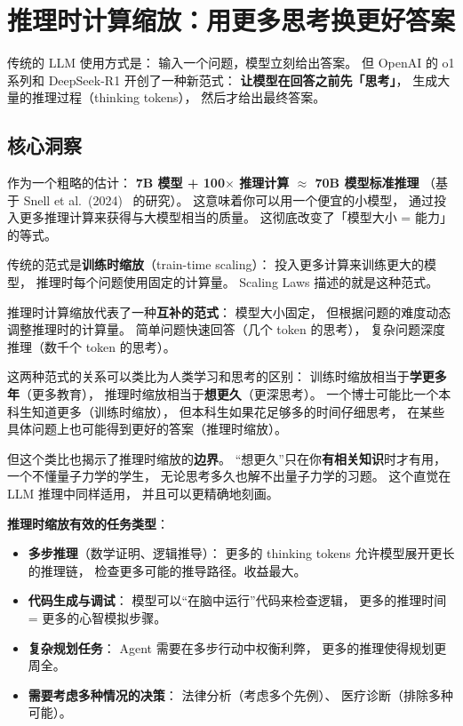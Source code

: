 \chapter{推理时计算缩放：用更多思考换更好答案}
\label{ch:ttc}

传统的 LLM 使用方式是：
输入一个问题，模型立刻给出答案。
但 OpenAI 的 o1 系列和 DeepSeek-R1 开创了一种新范式：
\textbf{让模型在回答之前先「思考」}，
生成大量的推理过程（thinking tokens），
然后才给出最终答案。

\section{核心洞察}

\begin{corebox}[推理时计算的颠覆性影响]
作为一个粗略的估计：
\textbf{7B 模型 + 100$\times$ 推理计算 $\approx$ 70B 模型标准推理}
（基于 Snell et al.\ (2024)~\cite{snell2024scaling} 的研究）。
这意味着你可以用一个便宜的小模型，
通过投入更多推理计算来获得与大模型相当的质量。
这彻底改变了「模型大小 = 能力」的等式。
\end{corebox}

传统的范式是\textbf{训练时缩放}（train-time scaling）：
投入更多计算来训练更大的模型，
推理时每个问题使用固定的计算量。
Scaling Laws 描述的就是这种范式。

推理时计算缩放代表了一种\textbf{互补的范式}：
模型大小固定，
但根据问题的难度动态调整推理时的计算量。
简单问题快速回答（几个 token 的思考），
复杂问题深度推理（数千个 token 的思考）。

这两种范式的关系可以类比为人类学习和思考的区别：
训练时缩放相当于\textbf{学更多年}（更多教育），
推理时缩放相当于\textbf{想更久}（更深思考）。
一个博士可能比一个本科生知道更多（训练时缩放），
但本科生如果花足够多的时间仔细思考，
在某些具体问题上也可能得到更好的答案（推理时缩放）。

但这个类比也揭示了推理时缩放的\textbf{边界}。
“想更久”只在你\textbf{有相关知识}时才有用，
一个不懂量子力学的学生，
无论思考多久也解不出量子力学的习题。
这个直觉在 LLM 推理中同样适用，
并且可以更精确地刻画。

\textbf{推理时缩放有效的任务类型}：
\begin{itemize}[noitemsep]
  \item \textbf{多步推理}（数学证明、逻辑推导）：
        更多的 thinking tokens 允许模型展开更长的推理链，
        检查更多可能的推导路径。收益最大。
  \item \textbf{代码生成与调试}：
        模型可以“在脑中运行”代码来检查逻辑，
        更多的推理时间 = 更多的心智模拟步骤。
  \item \textbf{复杂规划任务}：
        Agent 需要在多步行动中权衡利弊，
        更多的推理使得规划更周全。
  \item \textbf{需要考虑多种情况的决策}：
        法律分析（考虑多个先例）、
        医疗诊断（排除多种可能）。
\end{itemize}

